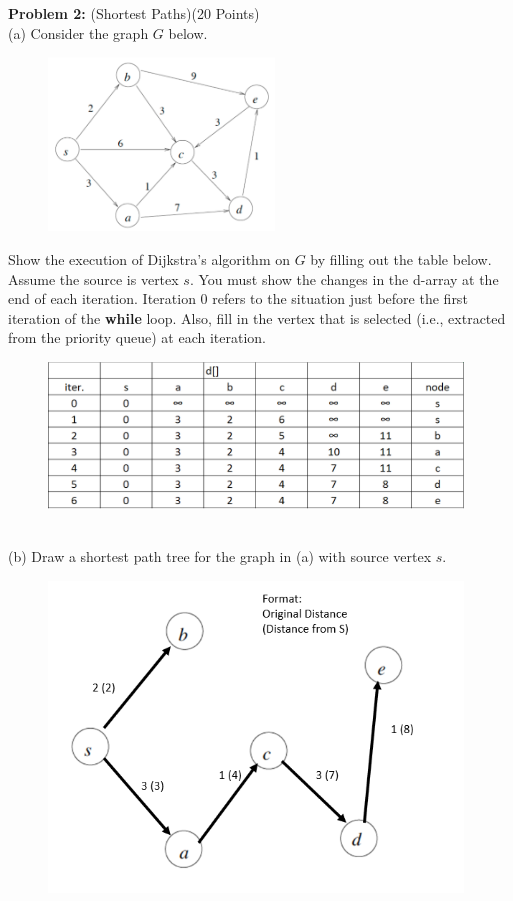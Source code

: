 \documentclass[11pt]{amsart}
\begin{document}
\textbf{Problem 2:} (Shortest Paths)\hfill (20 Points)\\

(a) Consider the graph $G$ below.
\begin{figure}[htb]
\begin{center}
\includegraphics[width=6cm]{SP}
\end{center}
\end{figure}

Show the execution of Dijkstra's algorithm on $G$ by filling out the table below. Assume the source is vertex $s$. You must show the changes in the
d-array at the end of each iteration. Iteration 0 refers to the situation just before the first  iteration of the {\bf while} loop. Also, fill in the vertex that is selected (i.e., extracted from the priority queue) at each iteration.
\begin{figure}[htb]
\begin{center}
\includegraphics[width=11cm]{2a}
\end{center}
\end{figure}

\newpage
\hrulefill \\

(b) Draw a shortest path tree for the graph in (a) with source vertex $s$.
\begin{figure}[htb]
\begin{center}
\includegraphics[width=11cm]{2b}
\end{center}
\end{figure}
\newpage
\hrulefill \\
\end{document}
